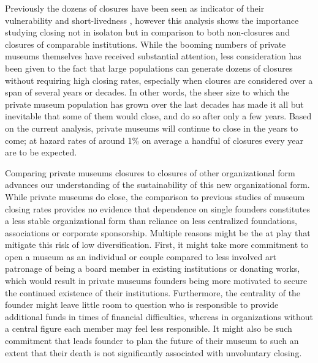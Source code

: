 \documentclass[12pt]{article}
\begin{document}
Previously the dozens of closures have been seen as indicator of their vulnerability and short-livedness \parencite{Adam_2020_close}, however this analysis shows the importance studying closing not in isolaton but in comparison to both non-closures and closures of comparable institutions.
While the booming numbers of private museums themselves have received substantial attention, less consideration has been given to the fact that large populations can generate dozens of closures without requiring high closing rates, especially when cloures are considered over a span of several years or decades.
In other words, the sheer size to which the private museum population has grown over the last decades has made it all but inevitable that some of them would close, and do so after only a few years.
Based on the current analysis, private museums will continue to close in the years to come; at hazard rates of around 1\% on average a handful of closures every year are to be expected.



Comparing private museums closures to closures of other organizational form advances our understanding of the sustainability of this new organizational form.
While private museums do close, the comparison to previous studies of museum closing rates provides no evidence that dependence on single founders constitutes a less stable organizational form than reliance on less centralized foundations, associations or corporate sponsorship.
Multiple reasons might be the at play that mitigate this risk of low diversification.
First, it might take more commitment to open a museum as an individual or couple compared to less involved art patronage of being a board member in existing institutions or donating works, which would result in private museums founders being more motivated to secure the continued existence of their institutions.
Furthermore, the centrality of the founder might leave little room to question who is responsible to provide additional funds in times of financial difficulties, whereas in organizations without a central figure each member may feel less responsible.
It might also be such commitment that leads founder to plan the future of their museum to such an extent that their death is not significantly associated with unvoluntary closing.
\end{document}
